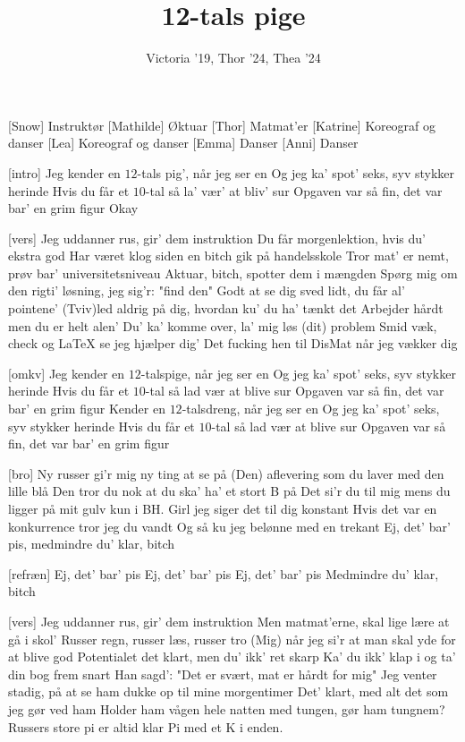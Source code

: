 \documentclass[a4paper,11pt]{article}
\title{12-tals pige}
\author{Victoria '19, Thor '24, Thea '24}
\begin{document}
\maketitle

\begin{roles}
[Snow] Instruktør
[Mathilde] Øktuar
[Thor] Matmat'er
[Katrine] Koreograf og danser
[Lea] Koreograf og danser
[Emma] Danser
[Anni] Danser
\end{roles}



\begin{song}
[intro] Jeg kender en $12$-tals pig', når jeg ser en
Og jeg ka' spot' seks, syv stykker herinde
Hvis du får et $10$-tal så la' vær' at bliv' sur
Opgaven var så fin, det var bar' en grim figur
Okay

  [vers] Jeg uddanner rus, gir' dem instruktion
Du får morgenlektion, hvis du' ekstra god
Har været klog siden en bitch gik på handelsskole
Tror mat' er nemt, prøv bar' universitetsniveau
Aktuar, bitch, spotter dem i mængden 
Spørg mig om den rigti' løsning, jeg sig'r: "find den" 
Godt at se dig sved lidt, du får al' pointene'
(Tviv)led aldrig på dig, hvordan ku' du ha' tænkt det
Arbejder hårdt men du er helt alen'
Du' ka' komme over, la' mig løs (dit) problem
Smid væk, check og LaTeX se jeg hjælper dig'
Det fucking hen til DisMat når jeg vækker dig

   [omkv] Jeg kender en $12$-talspige, når jeg ser en
Og jeg ka' spot' seks, syv stykker herinde
Hvis du får et $10$-tal så lad vær at blive sur 
Opgaven var så fin, det var bar' en grim figur 
Kender en $12$-talsdreng, når jeg ser en
Og jeg ka' spot' seks, syv stykker herinde
Hvis du får et $10$-tal så lad vær at blive sur 
Opgaven var så fin, det var bar' en grim figur

[bro] Ny russer gi'r mig ny ting at se på 
 (Den) aflevering som du laver med den lille blå
Den tror du nok at du ska' ha' et stort B på
Det si'r du til mig mens du ligger på mit gulv kun i BH. 
Girl jeg siger det til dig konstant
Hvis det var en konkurrence tror jeg du vandt
Og så ku jeg belønne med en trekant
Ej, det' bar' pis, medmindre du' klar, bitch

[refræn] Ej, det' bar' pis
Ej, det' bar' pis
Ej, det' bar' pis
Medmindre du' klar, bitch


  [vers] Jeg uddanner rus, gir' dem instruktion
Men matmat'erne, skal lige lære at gå i skol'
Russer regn, russer læs, russer tro
(Mig) når jeg si'r at man skal yde for at blive god
Potentialet det klart, men du' ikk' ret skarp
Ka' du ikk' klap i og ta' din bog frem snart
Han sagd': "Det er svært, mat er hårdt for mig"
Jeg venter stadig, på at se ham dukke op til mine morgentimer
Det' klart, med alt det som jeg gør ved ham
Holder ham vågen hele natten med tungen, gør ham tungnem?
Russers store pi er altid klar
Pi med et K i enden. 
 

\end{song}
\end{document}
